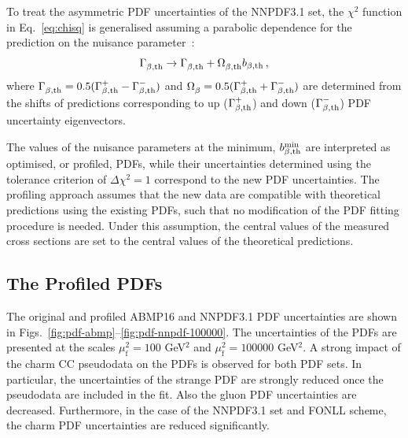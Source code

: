 \documentclass[pdftex,twocolumn,epjc3]{svjour3}          %
\newcommand{\abmp} {ABMP16\xspace}
\newcommand{\nnpdf} {NNPDF3.1\xspace}
\newcommand{\chisq}{\ensuremath{\chi^2}\xspace}
\begin{document}
To treat the asymmetric PDF uncertainties of the \nnpdf set, the
\chisq function in Eq.~\ref{eq:chisq} is generalised assuming a
parabolic dependence for the prediction on the nuisance
parameter~\cite{Alekhin:2014irh}:
\begin{eqnarray}
\Gamma^{}_{\beta, \rm th} \to \Gamma^{}_{\beta, \rm th} +  \Omega^{}_{\beta, \rm th}b_{\beta, \rm th}\,, \label{eq:iter}
\end{eqnarray}
where $\Gamma^{}_{\beta, \rm th} = 0.5(\Gamma^{+}_{\beta, \rm th} - \Gamma^{-}_{\beta, \rm th})$ and $\Omega^{}_{\beta} = 0.5(\Gamma^{+}_{\beta, \rm th}
+ \Gamma^{-}_{\beta, \rm th})$ are determined from the shifts of predictions corresponding to up ($\Gamma^{+}_{\beta, \rm th}$) and down ($ \Gamma^{-}_{\beta, \rm th}$) PDF uncertainty eigenvectors.

The values of the nuisance parameters at the minimum, $b^{\rm min}_{\beta,\rm th}$ are interpreted as optimised, or profiled, PDFs, while their uncertainties determined using the tolerance criterion of $\Delta\chi^2 = 1$ correspond to the new PDF uncertainties. The profiling approach assumes that the new data are compatible with theoretical predictions using the existing PDFs, such that no modification of the PDF fitting procedure is needed. Under this assumption, the central values of the measured cross sections are set to the central values of the theoretical predictions. 


\subsection{The Profiled PDFs}
\label{sec:profile}

The original and profiled \abmp and \nnpdf PDF uncertainties are shown in Figs.~\ref{fig:pdf-abmp}--\ref{fig:pdf-nnpdf-100000}. 
The uncertainties of the PDFs are presented at the scales $\mu_\mathrm{f}^2=100$ GeV$^2$ and $\mu_\mathrm{f}^2=100000$ GeV$^2$.
A strong impact of the charm CC pseudodata on the PDFs is observed for both PDF sets.
In particular, the uncertainties of the strange PDF are strongly reduced once the pseudodata are included in the fit. 
Also the gluon PDF uncertainties are decreased. Furthermore, in the case of the NNPDF3.1 set and FONLL scheme, the charm PDF uncertainties are reduced significantly.
\end{document}
